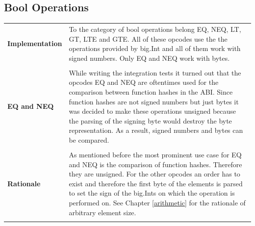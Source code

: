 \subsection{Bool Operations}
\begin{tabular}[t]{ p{3cm} p{12.5cm}}
\raggedright
\textbf{Implementation} & 
To the category of bool operations belong EQ, NEQ, LT, GT, LTE and GTE. All of these opcodes use the the operations provided by big.Int and all of them work with signed numbers. Only EQ and NEQ work with bytes. \\ \\
\raggedright
\textbf{EQ and NEQ} & 
While writing the integration tests it turned out that the opcodes EQ and NEQ are oftentimes used for the comparison between function hashes in the ABI. Since function hashes are not signed numbers but just bytes it was decided to make these operations unsigned because the parsing of the signing byte would destroy the byte representation. As a result, signed numbers and bytes can be compared. \\ \\

\raggedright
\textbf{Rationale} & 
As mentioned before the most prominent use case for EQ and NEQ is the comparison of function hashes. Therefore they are unsigned. For the other opcodes an order has to exist and therefore the first byte of the elements is parsed to set the sign of the big.Ints on which the operation is performed on.
See Chapter \ref{arithmetic} for the rationale of arbitrary element size. \\ \\
\end{tabular}

